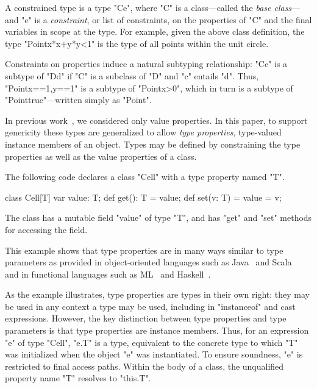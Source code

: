 \documentclass[preprint,nocopyrightspace,9pt]{sigplanconf}
\begin{document}
A constrained type is a type \xcd"C{e}", where \xcd"C" is a
class---called the \emph{base class}---and \xcd"e" is a
\emph{constraint}, or list of constraints, on the properties of
\xcd"C" and the final variables in scope at the type.
For example, given the above class definition,
the type \xcd"Point{x*x+y*y<1}" is the type of all
points within the unit circle.


Constraints on properties induce a natural subtyping relationship:
\xcd"C{c}" is a subtype of
\xcd"D{d}" if \xcd"C" is a subclass of \xcd"D" and
\xcd"c" entails \xcd"d".  Thus, \xcd"Point{x==1,y==1}"
is a subtype of \xcd"Point{x>0}", which in turn is a subtype of
\xcd"Point{true}"---written simply as \xcd"Point".

In previous
work~\cite{X10,constrained-types}, we considered
only value properties.
In this paper,
to support genericity these types are generalized
to allow \emph{type properties}, type-valued instance
members of an object.
Types may be defined by constraining the type properties as
well as the value properties of a class.

The following code declares a class \xcd"Cell" with a type
property named \xcd"T".
\begin{xten}
class Cell[T] {
    var value: T;
    def get(): T = value;
    def set(v: T) = { value = v; }
}
\end{xten}
The class has a mutable field \xcd"value" of type \xcd"T",
and has \xcd"get" and \xcd"set" methods for accessing the field.

This example shows that type properties are in many ways similar to
type parameters as provided in object-oriented languages such as
Java~\cite{Java3} and Scala~\cite{scala} and in functional
languages such as ML~\cite{ml} and
Haskell~\cite{haskell}.

As the example illustrates,
type properties are types in their own right:
they may be used in any context a type may be used,
including in \xcd"instanceof" and cast expressions.
%
However, the key distinction between type properties
and type parameters is that type properties are instance
members.
Thus, for an expression \xcd"e" of type \xcd"Cell", \xcd"e.T" is
a type, equivalent to the concrete type to which \xcd"T" was
initialized when the object \xcd"e" was instantiated.
To ensure
soundness, \xcd"e" is restricted to final access paths.
Within the body of a class, the unqualified property name \xcd"T" resolves
to \xcd"this.T".
\end{document}
